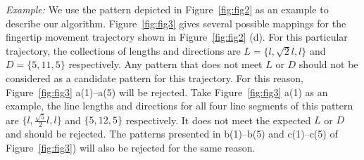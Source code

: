        \vspace{2mm}
       \noindent \emph{Example:} We use the pattern depicted in Figure~\ref{fig:fig2} as an example to
       describe our algorithm. Figure~\ref{fig:fig3} gives several
       possible mappings for the fingertip movement trajectory shown in Figure~\ref{fig:fig2} (d). For this particular trajectory, the collections of lengths and directions are
       $L=\{l, \sqrt{2}l, l\}$ and $D=\{5, 11, 5\}$ respectively. Any pattern that does not meet $L$ or $D$ should not be considered as a candidate pattern for this trajectory.
       For this reason, Figure~\ref{fig:fig3} a(1)--a(5) will be rejected. Take Figure~\ref{fig:fig3} a(1) as an example,
       the line lengths and directions for all four line segments of this pattern are  $\{l,
       \frac{\sqrt{5}}{2}l, l\}$ and $\{5,12,5\}$ respectively. It does not meet the expected $L$ or $D$ and should be rejected.
       The patterns presented in b(1)--b(5) and c(1)--c(5) of Figure~\ref{fig:fig3}) will
       also be rejected for the same reason.


